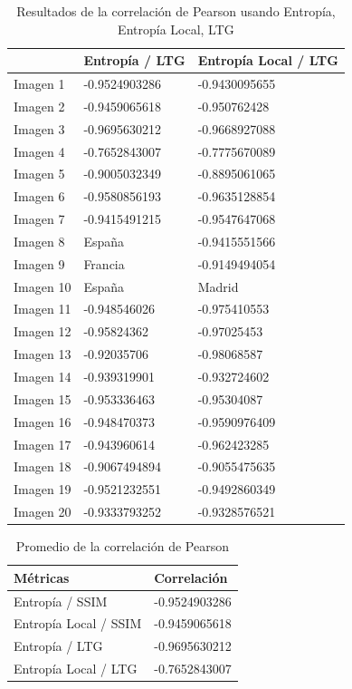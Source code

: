 \documentclass[spanish,twocolumn]{article}
\begin{document}
{\begin{table}[htbp]
\begin{center}
\begin{tabular}{|l|l|l|}
\hline
& Entropía / LTG & Entropía Local / LTG\\
\hline \hline
Imagen 1 & -0.9524903286 & -0.9430095655 \\ \hline
Imagen 2 & -0.9459065618 & -0.950762428 \\ \hline
Imagen 3 & -0.9695630212 & -0.9668927088 \\ \hline
Imagen 4 & -0.7652843007 & -0.7775670089 \\ \hline
Imagen 5 & -0.9005032349 & -0.8895061065 \\ \hline
Imagen 6 & -0.9580856193 & -0.9635128854 \\ \hline
Imagen 7 & -0.9415491215 & -0.9547647068 \\ \hline
Imagen 8 & España & -0.9415551566 \\ \hline
Imagen 9 & Francia & -0.9149494054 \\ \hline
Imagen 10 & España & Madrid \\ \hline
Imagen 11 & -0.948546026 & -0.975410553\\ \hline
Imagen 12 & -0.95824362 & -0.97025453 \\ \hline
Imagen 13 & -0.92035706 & -0.98068587 \\ \hline
Imagen 14 & -0.939319901 & -0.932724602 \\ \hline
Imagen 15 & -0.953336463 & -0.95304087  \\ \hline
Imagen 16 & -0.948470373 & -0.9590976409 \\ \hline
Imagen 17 & -0.943960614 & -0.962423285 \\ \hline
Imagen 18 & -0.9067494894 & -0.9055475635 \\ \hline
Imagen 19 & -0.9521232551 & -0.9492860349 \\ \hline
Imagen 20 & -0.9333793252 & -0.9328576521 \\ \hline
\end{tabular}
\caption{Resultados de la correlación de Pearson usando Entropía, Entropía Local, LTG}
\label{tabla:correlacionLTG}
\end{center}
\end{table}

\begin{table}[htbp]
\begin{center}
\begin{tabular}{|l|l|}
\hline
Métricas & Correlación \\
\hline \hline
Entropía / SSIM & -0.9524903286 \\ \hline
Entropía Local / SSIM & -0.9459065618\\ \hline
Entropía / LTG & -0.9695630212 \\ \hline
Entropía Local / LTG & -0.7652843007 \\ \hline
\end{tabular}
\caption{Promedio de la correlación de Pearson}
\label{tabla:promCorrelacion}
\end{center}
\end{table}

}
\end{document}
